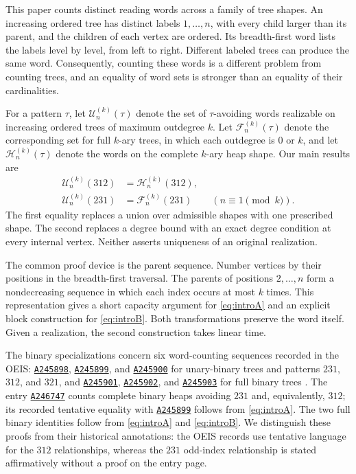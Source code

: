 \documentclass[11pt]{article}
\theoremstyle{definition}
\newcommand{\UB}{\mathcal U}
\newcommand{\FB}{\mathcal F}
\newcommand{\HP}{\mathcal H}
\newcommand{\seq}[1]{\href{https://oeis.org/#1}{\texttt{#1}}}
\begin{document}
This paper counts distinct reading words across a family of tree shapes. An increasing ordered tree has distinct labels $1,\ldots,n$, with every child larger than its parent, and the children of each vertex are ordered. Its breadth-first word lists the labels level by level, from left to right. Different labeled trees can produce the same word. Consequently, counting these words is a different problem from counting trees, and an equality of word sets is stronger than an equality of their cardinalities.

For a pattern $\tau$, let $\UB_n^{(k)}(\tau)$ denote the set of $\tau$-avoiding words realizable on increasing ordered trees of maximum outdegree $k$. Let $\FB_n^{(k)}(\tau)$ denote the corresponding set for full $k$-ary trees, in which each outdegree is $0$ or $k$, and let $\HP_n^{(k)}(\tau)$ denote the words on the complete $k$-ary heap shape. Our main results are
\begin{align}
\UB_n^{(k)}(312)&=\HP_n^{(k)}(312),\label{eq:introA}\\
\UB_n^{(k)}(231)&=\FB_n^{(k)}(231)\qquad(n\equiv1\pmod{k}).\label{eq:introB}
\end{align}
The first equality replaces a union over admissible shapes with one prescribed shape. The second replaces a degree bound with an exact degree condition at every internal vertex. Neither asserts uniqueness of an original realization.

The common proof device is the parent sequence. Number vertices by their positions in the breadth-first traversal. The parents of positions $2,\ldots,n$ form a nondecreasing sequence in which each index occurs at most $k$ times. This representation gives a short capacity argument for \eqref{eq:introA} and an explicit block construction for \eqref{eq:introB}. Both transformations preserve the word itself. Given a realization, the second construction takes linear time.

The binary specializations concern six word-counting sequences recorded in the OEIS: \seq{A245898}, \seq{A245899}, and \seq{A245900} for unary-binary trees and patterns $231$, $312$, and $321$, and \seq{A245901}, \seq{A245902}, and \seq{A245903} for full binary trees \cite{OEIS}. The entry \seq{A246747} counts complete binary heaps avoiding $231$ and, equivalently, $312$; its recorded tentative equality with \seq{A245899} follows from \eqref{eq:introA}. The two full binary identities follow from \eqref{eq:introA} and \eqref{eq:introB}. We distinguish these proofs from their historical annotations: the OEIS records use tentative language for the $312$ relationships, whereas the $231$ odd-index relationship is stated affirmatively without a proof on the entry page.
\end{document}
